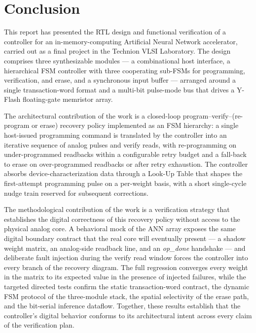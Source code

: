 
\chapter{Conclusion}
\label{ch:conclusion}

This report has presented the RTL design and functional verification of
a controller for an in-memory-computing Artificial Neural Network
accelerator, carried out as a final project in the Technion VLSI
Laboratory. The design comprises three synthesizable modules ---
a combinational host interface, a hierarchical FSM controller with
three cooperating sub-FSMs for programming, verification, and erase,
and a synchronous input buffer --- arranged around a single
transaction-word format and a multi-bit pulse-mode bus that drives a
Y-Flash floating-gate memristor array.

The architectural contribution of the work is a closed-loop
program--verify--(re-program or erase) recovery policy implemented as
an FSM hierarchy: a single host-issued programming command is
translated by the controller into an iterative sequence of analog
pulses and verify reads, with re-programming on under-programmed
readbacks within a configurable retry budget and a fall-back to erase
on over-programmed readbacks or after retry exhaustion. The
controller absorbs device-characterization data through a Look-Up
Table that shapes the first-attempt programming pulse on a per-weight
basis, with a short single-cycle nudge train reserved for subsequent
corrections.

The methodological contribution of the work is a verification strategy
that establishes the digital correctness of this recovery policy
without access to the physical analog core. A behavioral mock of the
ANN array exposes the same digital boundary contract that the real
core will eventually present --- a shadow weight matrix, an
analog-side readback line, and an \emph{op\_done} handshake --- and
deliberate fault injection during the verify read window forces the
controller into every branch of the recovery diagram. The full
regression converges every weight in the matrix to its expected value
in the presence of injected failures, while the targeted directed
tests confirm the static transaction-word contract, the dynamic FSM
protocol of the three-module stack, the spatial selectivity of the
erase path, and the bit-serial inference dataflow. Together, these
results establish that the controller's digital behavior conforms to
its architectural intent across every claim of the verification plan.

